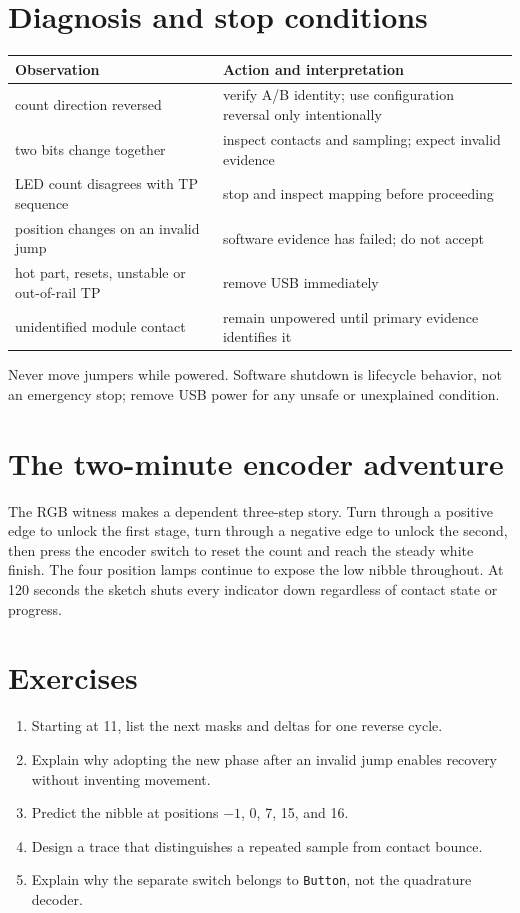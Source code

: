 \documentclass[11pt]{article}
\begin{document}
\section{Diagnosis and stop conditions}

\begin{tabularx}{\linewidth}{@{}X X@{}}
\toprule
Observation & Action and interpretation\\
\midrule
count direction reversed & verify A/B identity; use configuration reversal only intentionally\\
two bits change together & inspect contacts and sampling; expect invalid evidence\\
LED count disagrees with TP sequence & stop and inspect mapping before proceeding\\
position changes on an invalid jump & software evidence has failed; do not accept\\
hot part, resets, unstable or out-of-rail TP & remove USB immediately\\
unidentified module contact & remain unpowered until primary evidence identifies it\\
\bottomrule
\end{tabularx}

Never move jumpers while powered. Software shutdown is lifecycle behavior, not
an emergency stop; remove USB power for any unsafe or unexplained condition.

\section{The two-minute encoder adventure}

The RGB witness makes a dependent three-step story. Turn through a positive
edge to unlock the first stage, turn through a negative edge to unlock the
second, then press the encoder switch to reset the count and reach the steady
white finish. The four position lamps continue to expose the low nibble
throughout. At 120 seconds the sketch shuts every indicator down regardless of
contact state or progress.

\section{Exercises}

\begin{enumerate}
  \item Starting at 11, list the next masks and deltas for one reverse cycle.
  \item Explain why adopting the new phase after an invalid jump enables
        recovery without inventing movement.
  \item Predict the nibble at positions \(-1\), 0, 7, 15, and 16.
  \item Design a trace that distinguishes a repeated sample from contact bounce.
  \item Explain why the separate switch belongs to \texttt{Button}, not the
        quadrature decoder.
\end{enumerate}
\end{document}
